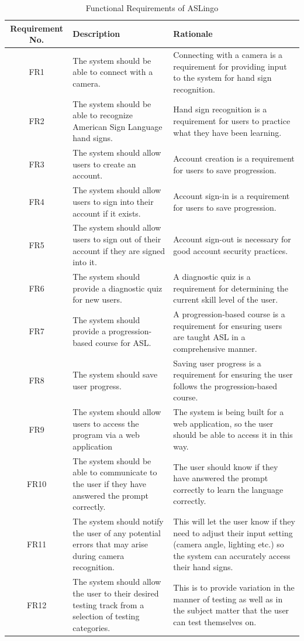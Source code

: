 \documentclass[12pt, titlepage]{article}
\begin{document}
\begin{longtable}{| c | p{4cm}| p{6cm}|}
\caption{Functional Requirements of ASLingo}
\hline
\textbf{Requirement No.} & \textbf{Description} &\textbf{Rationale}\\
\hline
FR1 & The system should be able to connect with a camera. & Connecting with a camera is a requirement for providing input to the system for hand sign recognition. \\
\hline
FR2 & The system should be able to recognize American Sign Language hand signs. & Hand sign recognition is a requirement for users to practice what they have been learning. \\
\hline
FR3 & The system should allow users to create an account. & Account creation is a requirement for users to save progression. \\
\hline
FR4 & The system should allow users to sign into their account if it exists. & Account sign-in is a requirement for users to save progression. \\
\hline
FR5 & The system should allow users to sign out of their account if they are signed into it. & Account sign-out is necessary for good account security practices. \\
\hline
FR6 & The system should provide a diagnostic quiz for new users. & A diagnostic quiz is a requirement for determining the current skill level of the user. \\
\hline
FR7 & The system should provide a progression-based course for ASL. & A progression-based course is a requirement for ensuring users are taught ASL in a comprehensive manner. \\
\hline
FR8 & The system should save user progress. & Saving user progress is a requirement for ensuring the user follows the progression-based course. \\
\hline
FR9 & The system should allow users to access the program via a web application & The system is being built for a web application, so the user should be able to access it in this way. \\
\hline
FR10 & The system should be able to communicate to the user if they have answered the prompt correctly. & The user should know if they have answered the prompt correctly to learn the language correctly. \\ 
\hline
FR11 & The system should notify the user of any potential errors that may arise during camera recognition. & This will let the user know if they need to adjust their input setting (camera angle, lighting etc.) so the system can accurately access their hand signs. \\
\hline
FR12 & The system should allow the user to their desired testing track from a selection of testing categories. & This is to provide variation in the manner of testing as well as in the subject matter that the user can test themselves on. \\
\bottomrule
\end{longtable}
\end{document}
